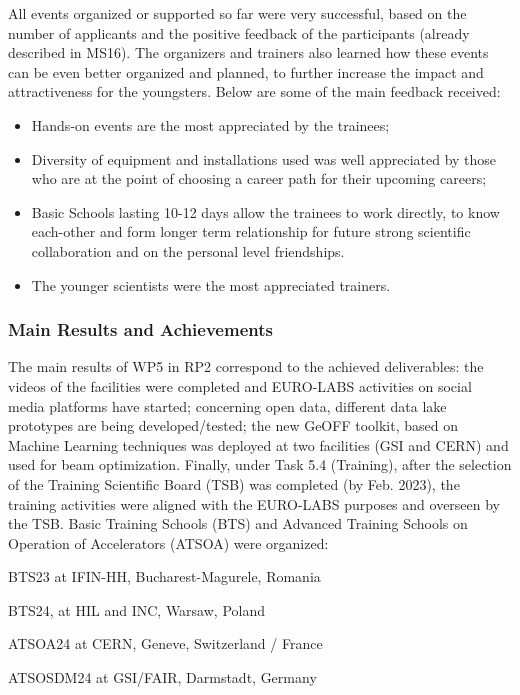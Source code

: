 All events organized or supported so far were very successful, based on the number of applicants and the positive feedback of the participants (already described in MS16). The organizers and trainers also learned
how these events can be even better organized and planned, to further increase the impact and attractiveness for the youngsters.
Below are some of the main feedback received:
\begin{itemize}
\item Hands-on events are the most appreciated by the trainees;
\item Diversity of equipment and installations used was well appreciated by those who are at the point of choosing a career path for their upcoming careers;
\item Basic Schools lasting 10-12 days allow the trainees to work directly, to know each-other 
and form longer term relationship for future strong scientific collaboration and on the personal level friendships.
\item The younger scientists were the most appreciated trainers.
\end{itemize}

\subsubsection*{Main Results and Achievements}

The main results of WP5 in RP2 correspond to the achieved deliverables: the videos of the facilities were completed and EURO-LABS activities on social media platforms have started; concerning open data, different data lake prototypes are being developed/tested; 
the new GeOFF toolkit, based on Machine Learning techniques was deployed at two facilities (GSI and CERN) and used for beam optimization. Finally, under Task 5.4 (Training), after the selection of the Training Scientific Board (TSB) was completed (by Feb. 2023), the training  activities were aligned with the EURO-LABS purposes %
and overseen by the TSB. Basic Training Schools (BTS) and Advanced Training Schools on Operation of Accelerators (ATSOA) were organized:

BTS23 at IFIN-HH, Bucharest-Magurele, Romania

BTS24, at HIL and INC, Warsaw, Poland

ATSOA24 at CERN, Geneve, Switzerland / France

ATSOSDM24 at GSI/FAIR, Darmstadt, Germany

